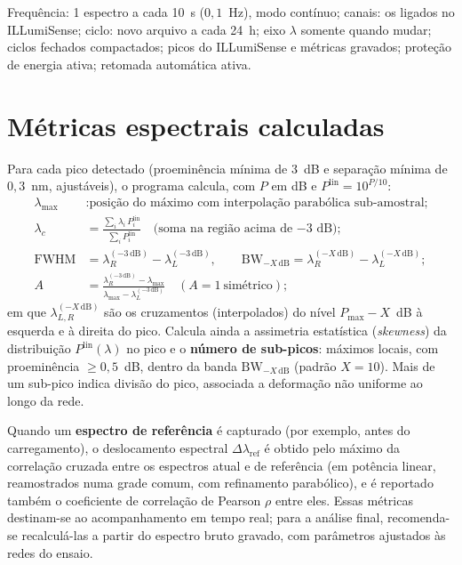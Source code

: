 \documentclass[11pt,a4paper]{article}
\begin{document}
\begin{tcolorbox}[colback=fundo,colframe=ink2,boxrule=0.4pt,arc=2pt,left=4pt,right=4pt,top=3pt,bottom=3pt,
  title=\small\bfseries Configuração usada no ensaio de retração do concreto,fonttitle=\bfseries]
\small
Frequência: 1 espectro a cada 10~s ($0{,}1$~Hz), modo contínuo; canais: os ligados no ILLumiSense;
ciclo: novo arquivo a cada 24~h; eixo $\lambda$ somente quando mudar; ciclos fechados compactados;
picos do ILLumiSense e métricas gravados; proteção de energia ativa; retomada automática ativa.
\end{tcolorbox}

\section{Métricas espectrais calculadas}
\label{sec:metricas}

Para cada pico detectado (proeminência mínima de 3~dB e separação mínima de $0{,}3$~nm, ajustáveis),
o programa calcula, com $P$ em dB e $P^{\text{lin}} = 10^{P/10}$:
\begin{align}
\lambda_{\max} &: \text{posição do máximo com interpolação parabólica sub-amostral;} \\
\lambda_c &= \frac{\sum_i \lambda_i\,P^{\text{lin}}_i}{\sum_i P^{\text{lin}}_i}\quad
  \text{(soma na região acima de $-3$~dB);} \\
\text{FWHM} &= \lambda_R^{(-3\,\mathrm{dB})} - \lambda_L^{(-3\,\mathrm{dB})},\qquad
\text{BW}_{-X\,\mathrm{dB}} = \lambda_R^{(-X\,\mathrm{dB})} - \lambda_L^{(-X\,\mathrm{dB})}; \\
A &= \frac{\lambda_R^{(-3\,\mathrm{dB})} - \lambda_{\max}}{\lambda_{\max} - \lambda_L^{(-3\,\mathrm{dB})}}
  \quad (A = 1\ \text{simétrico});
\end{align}
em que $\lambda_{L,R}^{(-X\,\mathrm{dB})}$ são os cruzamentos (interpolados) do nível $P_{\max} - X$~dB
à esquerda e à direita do pico. Calcula ainda a assimetria estatística (\emph{skewness}) da
distribuição $P^{\text{lin}}(\lambda)$ no pico e o \textbf{número de sub-picos}: máximos locais, com
proeminência $\ge 0{,}5$~dB, dentro da banda $\text{BW}_{-X\,\mathrm{dB}}$ (padrão $X=10$). Mais de um
sub-pico indica divisão do pico, associada a deformação não uniforme ao longo da rede.

Quando um \textbf{espectro de referência} é capturado (por exemplo, antes do carregamento), o
deslocamento espectral $\Delta\lambda_{\text{ref}}$ é obtido pelo máximo da correlação cruzada entre
os espectros atual e de referência (em potência linear, reamostrados numa grade comum, com refinamento
parabólico), e é reportado também o coeficiente de correlação de Pearson $\rho$ entre eles. Essas
métricas destinam-se ao acompanhamento em tempo real; para a análise final, recomenda-se recalculá-las
a partir do espectro bruto gravado, com parâmetros ajustados às redes do ensaio.
\end{document}
